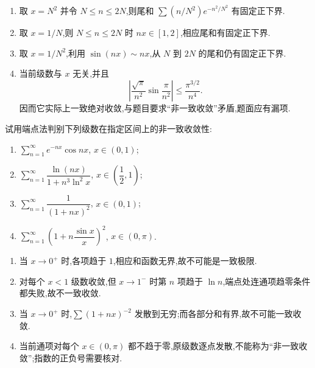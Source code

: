 \begin{solution}
    \begin{enumerate}
        \item 取 $x=N^2$ 并令 $N\leq n\leq2N$,则尾和
              $\sum(n/N^2)e^{-n^2/N^2}$ 有固定正下界.
        \item 取 $x=1/N$,则 $N\leq n\leq2N$ 时 $nx\in[1,2]$,相应尾和有固定正下界.
        \item 取 $x=1/N^2$,利用 $\sin(nx)\sim nx$,从 $N$ 到 $2N$ 的尾和仍有固定正下界.
        \item 当前级数与 $x$ 无关,并且
              \[
                  \left|\dfrac{\sqrt\pi}{n^2}\sin\dfrac{\pi}{n^2}\right|
                  \leq\dfrac{\pi^{3/2}}{n^4}.
              \]
              因而它实际上一致绝对收敛,与题目要求“非一致收敛”矛盾,题面应有漏项.
    \end{enumerate}
\end{solution}

\begin{example}
    试用端点法判别下列级数在指定区间上的非一致收敛性:
    \begin{enumerate}
        \item $\displaystyle\sum\limits_{n=1}^{\infty}e^{-nx}\cos nx$, $x\in(0,1)$;
        \item $\displaystyle\sum\limits_{n=1}^{\infty}\dfrac{\ln(nx)}{1+n^3\ln^2x}$, $x\in\left(\dfrac{1}{2},1\right)$;
        \item $\displaystyle\sum\limits_{n=1}^{\infty}\dfrac{1}{(1+nx)^2}$, $x\in(0,1)$;
        \item $\displaystyle\sum\limits_{n=1}^{\infty}\left(1+n\dfrac{\sin x}{x}\right)^2$, $x\in(0,\pi)$.
    \end{enumerate}
\end{example}
\exampleblank

\begin{solution}
    \begin{enumerate}
        \item 当 $x\to0^+$ 时,各项趋于 $1$,相应和函数无界,故不可能是一致极限.
        \item 对每个 $x<1$ 级数收敛,但 $x\to1^-$ 时第 $n$ 项趋于 $\ln n$,端点处连通项趋零条件都失败,故不一致收敛.
        \item 当 $x\to0^+$ 时,$\sum(1+nx)^{-2}$ 发散到无穷;而各部分和有界,故不可能一致收敛.
        \item 当前通项对每个 $x\in(0,\pi)$ 都不趋于零,原级数逐点发散,不能称为“非一致收敛”;指数的正负号需要核对.
    \end{enumerate}
\end{solution}

